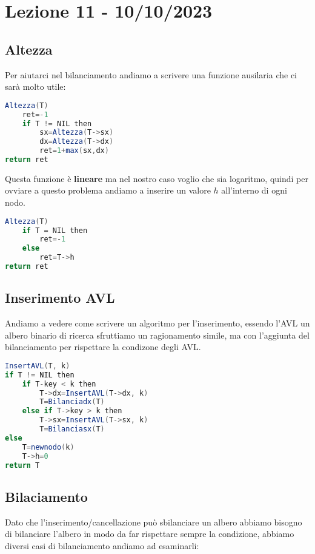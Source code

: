 
\section{Lezione 11 - 10/10/2023}

\subsection{Altezza}
Per aiutarci nel bilanciamento andiamo a scrivere una funzione ausilaria che ci sarà molto utile:
\begin{lstlisting}[language=Java]
Altezza(T)
    ret=-1
    if T != NIL then
        sx=Altezza(T->sx)
        dx=Altezza(T->dx)
        ret=1+max(sx,dx)
return ret
\end{lstlisting}
Questa funzione è \textbf{lineare} ma nel nostro caso voglio che sia logaritmo, quindi per ovviare a questo problema andiamo a inserire un valore $h$ all'interno di ogni nodo.

\begin{lstlisting}[language=Java]
Altezza(T)
    if T = NIL then
        ret=-1
    else
        ret=T->h
return ret
\end{lstlisting}

\subsection{Inserimento AVL}
Andiamo a vedere come scrivere un algoritmo per l'inserimento, essendo l'AVL un albero binario di ricerca sfruttiamo un ragionamento simile, ma con l'aggiunta del bilanciamento per rispettare la condizone degli AVL.
\begin{lstlisting}[language=Java]
InsertAVL(T, k)
if T != NIL then
    if T-key < k then
        T->dx=InsertAVL(T->dx, k)
        T=Bilanciadx(T)
    else if T->key > k then
        T->sx=InsertAVL(T->sx, k)
        T=Bilanciasx(T)
else 
    T=newnodo(k)
    T->h=0
return T
\end{lstlisting}

\subsection{Bilaciamento}
Dato che l'inserimento/cancellazione può sbilanciare un albero abbiamo bisogno di bilanciare l'albero in modo da far rispettare sempre la condizione, abbiamo diversi casi di bilanciamento andiamo ad esaminarli:

